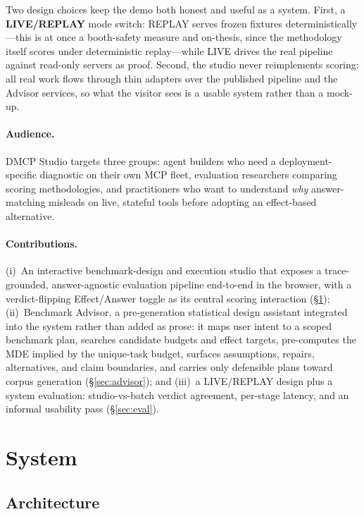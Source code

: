 \documentclass[11pt]{article}
\begin{document}
Two design choices keep the demo both honest and useful as a system. First, a
\textbf{LIVE/REPLAY} mode switch: REPLAY serves frozen fixtures
deterministically---this is at once a booth-safety measure and on-thesis, since
the methodology itself scores under deterministic replay---while LIVE drives the
real pipeline against read-only servers as proof. Second, the studio never
reimplements scoring: all real work flows through thin adapters over the
published pipeline and the Advisor services, so what the visitor sees is a
usable system rather than a mock-up.

\paragraph{Audience.} DMCP Studio targets three groups: agent builders who
need a deployment-specific diagnostic on their own MCP fleet, evaluation
researchers comparing scoring methodologies, and practitioners who want to
understand \emph{why} answer-matching misleads on live, stateful tools before
adopting an effect-based alternative.

\paragraph{Contributions.} (i)~An interactive benchmark-design and execution
studio that exposes a trace-grounded, answer-agnostic evaluation pipeline
end-to-end in the browser, with a verdict-flipping Effect/Answer toggle as its
central scoring interaction (\S\ref{sec:system}); (ii)~Benchmark Advisor, a
pre-generation statistical design assistant integrated into the system rather
than added as prose: it maps user intent to a scoped benchmark plan, searches
candidate budgets and effect targets, pre-computes the MDE implied by the
unique-task budget, surfaces assumptions, repairs, alternatives, and claim
boundaries, and carries only defensible plans toward corpus generation
(\S\ref{sec:advisor}); and (iii)~a LIVE/REPLAY design plus a system evaluation:
studio-vs-batch verdict agreement, per-stage latency, and an informal usability
pass (\S\ref{sec:eval}).



\section{System}
\label{sec:system}

\subsection{Architecture}
\end{document}
